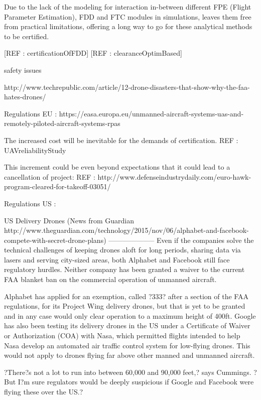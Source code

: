 Due to the lack of the modeling for interaction in-between different FPE  (Flight Parameter Estimation), FDD and FTC modules in simulations, leaves them free from practical limitations, offering a long way to go for these analytical methods to be certified. 

[REF : certificationOfFDD]
[REF : clearanceOptimBased]


safety issues

http://www.techrepublic.com/article/12-drone-disasters-that-show-why-the-faa-hates-drones/


Regulations EU : https://easa.europa.eu/unmanned-aircraft-systems-uas-and-remotely-piloted-aircraft-systems-rpas

The increased cost will be inevitable for the demands of certification. REF : UAVreliabilityStudy

This increment could be even beyond expectations that it could lead to a cancellation of project:  REF : http://www.defenseindustrydaily.com/euro-hawk-program-cleared-for-takeoff-03051/

Regulations US : 

US Delivery Drones (News from Guardian http://www.theguardian.com/technology/2015/nov/06/alphabet-and-facebook-compete-with-secret-drone-plans)
--------------------
Even if the companies solve the technical challenges of keeping drones aloft for long periods, sharing data via lasers and serving city-sized areas, both Alphabet and Facebook still face regulatory hurdles. Neither company has been granted a waiver to the current FAA blanket ban on the commercial operation of unmanned aircraft.

Alphabet has applied for an exemption, called ?333? after a section of the FAA regulations, for its Project Wing delivery drones, but that is yet to be granted and in any case would only clear operation to a maximum height of 400ft. Google has also been testing its delivery drones in the US under a Certificate of Waiver or Authorization (COA) with Nasa, which permitted flights intended to help Nasa develop an automated air traffic control system for low-flying drones. This would not apply to drones flying far above other manned and unmanned aircraft.

?There?s not a lot to run into between 60,000 and 90,000 feet,? says Cummings. ?But I?m sure regulators would be deeply suspicious if Google and Facebook were flying these over the US.?


